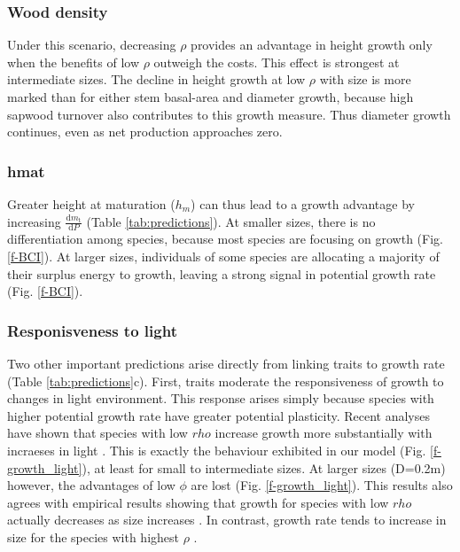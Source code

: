 \documentclass[12pt, a4paper]{article}
\begin{document}
\subsubsection{Wood density}\label{wood-density}

Under this scenario, decreasing $\rho$ provides an advantage in height
growth only when the benefits of low $\rho$ outweigh the costs. This
effect is strongest at intermediate sizes. The decline in height growth
at low $\rho$ with size is more marked than for either stem basal-area
and diameter growth, because high sapwood turnover also contributes to
this growth measure. Thus diameter growth continues, even as net
production approaches zero.

\subsubsection{hmat}\label{hmax}

 Greater height at maturation ($h_m$)
can thus lead to a growth advantage by increasing
$\frac{\textrm{d}m_\textrm{t}}{\textrm{d}P}$ (Table
\ref{tab:predictions}). At smaller sizes, there is no differentiation
among species, because most species are focusing on growth (Fig.
\ref{f-BCI}). At larger sizes, individuals of some species are
allocating a majority of their surplus energy to growth, leaving a
strong signal in potential growth rate (Fig. \ref{f-BCI}).


\subsubsection{Responisveness to light}\label{hmax}

Two other important predictions arise directly from linking traits to
growth rate (Table \ref{tab:predictions}c). First, traits moderate the
responsiveness of growth to changes in light environment. This response
arises simply because species with higher potential growth rate have
greater potential plasticity. Recent analyses have shown that species
with low $rho$ increase growth more substantially with incraeses in
light \citep{ruger-2012}. This is exactly the behaviour
exhibited in our model (Fig. \ref{f-growth_light}), at least for small
to intermediate sizes. At larger sizes (D=0.2m) however, the advantages
of low $\phi$ are lost (Fig. \ref{f-growth_light}). This results also
agrees with empirical results showing that growth for species with low
$rho$ actually decreases as size
increases \citep{ruger-2012}. In contrast, growth rate tends
to increase in size for the species with highest
$\rho$ \citep{ruger-2012}.
\end{document}
